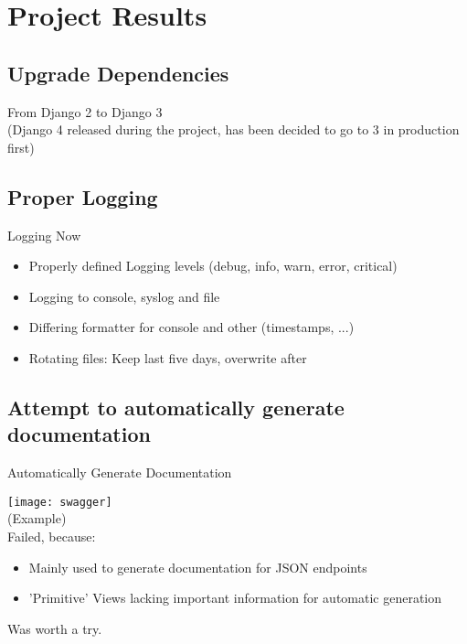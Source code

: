 \section{Project Results}

\subsection{Upgrade Dependencies}

\begin{frame}[c]
    From Django 2 to Django 3 \\
    (Django 4 released during the project, has been decided to go to 3 in production first)
\end{frame}

\subsection{Proper Logging}


\begin{frame}[c]{Logging Now}
    \large
    \begin{itemize}[<+(1)->]
        \item Properly defined Logging levels (debug, info, warn, error, critical)
        \item Logging to console, syslog and file
        \item Differing formatter for console and other (timestamps, ...)
        \item Rotating files: Keep last five days, overwrite after
    \end{itemize}
\end{frame}

\subsection{Attempt to automatically generate documentation}

\begin{frame}[c]{Automatically Generate Documentation}
    \begin{multicols}{2}
        \large
        \texttt{[image: swagger]} \\
        (Example) \\
        Failed, because:
        \begin{itemize}[<+(1)->]
            \item Mainly used to generate documentation for JSON endpoints
            \item 'Primitive' Views lacking important information for automatic generation
        \end{itemize}
        Was worth a try.
    \end{multicols}
\end{frame}

